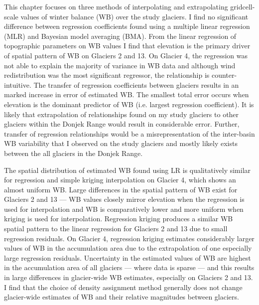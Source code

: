 \documentclass{sfuthesis}
\begin{document}
This chapter focuses on three methods of interpolating and extrapolating gridcell-scale values of winter balance (WB) over the study glaciers. I find no significant difference between regression coefficients found using a multiple linear regression (MLR) and Bayesian model averaging (BMA). From the linear regression of topographic parameters on WB values I find that elevation is the primary driver of spatial pattern of WB on Glaciers 2 and 13. On Glacier 4, the regression was not able to explain the majority of variance in WB data and although wind redistribution was the most significant regressor, the relationship is counter-intuitive.  The transfer of regression coefficients between glaciers results in an marked increase in error of estimated WB. The smallest total error occurs when elevation is the dominant predictor of WB (i.e. largest regression coefficient). It is likely that extrapolation of relationships found on my study glaciers to other glaciers within the Donjek Range would result in considerable error. Further, transfer of regression relationships would be a misrepresentation of the inter-basin WB variability that I observed on the study glaciers and mostly likely exists between the all glaciers in the Donjek Range. 

The spatial distribution of estimated WB found using LR is qualitatively similar for regression and simple kriging interpolation on Glacier 4, which shows an almost uniform WB. Large differences in the spatial pattern of WB exist for Glaciers 2 and 13 --- WB values closely mirror elevation when the regression is used for interpolation and WB is comparatively lower and more uniform when kriging is used for interpolation. Regression kriging produces a similar WB spatial pattern to the linear regression for Glaciers 2 and 13 due to small regression residuals. On Glacier 4, regression kriging estimates considerably larger values of WB in the accumulation area due to the extrapolation of one especially large regression residuals. Uncertainty in the estimated values of WB are highest in the accumulation area of all glaciers --- where data is sparse --- and this results in large differences in glacier-wide WB estimates, especially on Glaciers 2 and 13. I find that the choice of density assignment method generally does not change glacier-wide estimates of WB and their relative magnitudes between glaciers.



\end{document}
